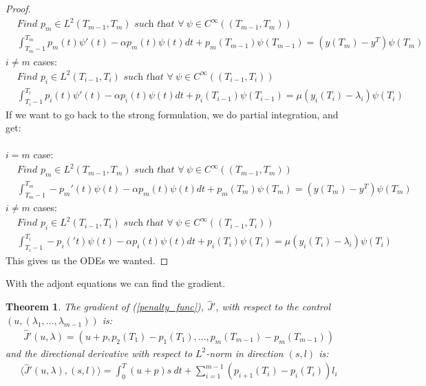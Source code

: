 \documentclass[11pt,a4paper]{article}
\newtheorem{theorem}{Theorem}
\begin{document}
\begin{proof}
\begin{align*}
&\textit{Find $p_m \in L^2(T_{m-1},T_m)$ such that }\forall \ \psi \in C^{\infty}((T_{m-1},T_m)) \\
&\int_{T_m-1}^{T_m}p_m(t)\psi'(t)-\alpha p_m(t)\psi(t)dt +p_m(T_{m-1})\psi(T_{m-1})
= (y(T_m)-y^T)\psi(T_m)\ 
\end{align*}
$i\neq m$ cases:
\begin{align*}
&\textit{Find $p_i \in L^2(T_{i-1},T_i)$ such that }\forall \ \psi \in C^{\infty}((T_{i-1},T_i))\\
&\int_{T_i-1}^{T_i}p_i(t)\psi'(t)-\alpha p_i(t)\psi(t)dt +p_i(T_{i-1})\psi(T_{i-1})
= \mu(y_{i}(T_i)-\lambda_i )\psi(T_i) \ 
\end{align*}
If we want to go back to the strong formulation, we do partial integration, and get:
\\
\\
 $i=m$ case:
\begin{align*}
&\textit{Find $p_m \in L^2(T_{m-1},T_m)$ such that }\forall \ \psi \in C^{\infty}((T_{m-1},T_m)) \\
&\int_{T_m-1}^{T_m}-p_m'(t)\psi(t)-\alpha p_m(t)\psi(t)dt +p_m(T_{m})\psi(T_{m})
= (y(T_m)-y^T)\psi(T_m)\ 
\end{align*}
$i\neq m$ cases:
\begin{align*}
&\textit{Find $p_i \in L^2(T_{i-1},T_i)$ such that }\forall \ \psi \in C^{\infty}((T_{i-1},T_i))\\
&\int_{T_i-1}^{T_i}-p_i('t)\psi(t)-\alpha p_i(t)\psi(t)dt +p_i(T_{i})\psi(T_{i})
= \mu(y_{i}(T_i)-\lambda_i )\psi(T_i) \ 
\end{align*}
This gives us the ODEs we wanted.
\end{proof}
With the adjont equations we can find the gradient.
\begin{theorem}
The gradient of (\ref{penalty_func}), $\hat{J}'$, with respect to the control $(u,(\lambda_1,...,\lambda_{m-1}))$ is:
\begin{align*}
\hat{J}'(u,\lambda) = (u+p,p_{2}(T_1) -p_{1}(T_1),..., p_{m}(T_{m-1}) -p_{m}(T_{m-1}))
\end{align*} 
and the directional derivative with respect to $L^2$-norm in direction $(s,l)$ is:
\begin{align*}
\langle \hat{J}'(u,\lambda), (s,l)\rangle = \int_0^T (u+p)s \ dt +\sum_{i=1}^{m-1}(p_{i+1}(T_i) -p_{i}(T_i) )l_i
\end{align*}
\end{theorem}
\end{document}
